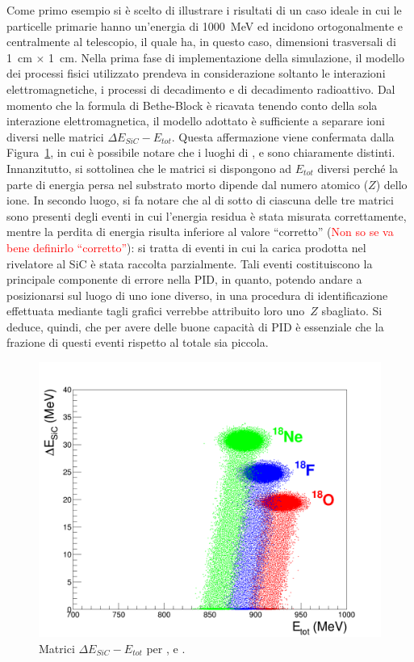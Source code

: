 Come primo esempio si è scelto di illustrare i risultati di un caso ideale in cui le particelle primarie hanno un'energia di 1000~MeV ed incidono ortogonalmente e centralmente al telescopio, il quale ha, in questo caso, dimensioni trasversali di 1~cm $\times$ 1~cm.
Nella prima fase di implementazione della simulazione, il modello dei processi fisici utilizzato prendeva in considerazione soltanto le interazioni elettromagnetiche, i processi di decadimento e di decadimento radioattivo.
Dal momento che la formula di Bethe-Block è ricavata tenendo conto della sola interazione elettromagnetica, il modello adottato è sufficiente a separare ioni diversi nelle matrici $\Delta E_{SiC} - E_{tot}$.
Questa affermazione viene confermata dalla Figura~\ref{fig:deltaE_ETot}, in cui è possibile notare che i luoghi di ,  e  sono chiaramente distinti.
Innanzitutto, si sottolinea che le matrici si dispongono ad $E_{tot}$ diversi perché la parte di energia persa nel substrato morto dipende dal numero atomico ($Z$) dello ione.
In secondo luogo, si fa notare che al di sotto di ciascuna delle tre matrici sono presenti degli eventi in cui l'energia residua è stata misurata correttamente, mentre la perdita di energia risulta inferiore al valore ``corretto'' (\textcolor{red}{Non so se va bene definirlo ``corretto''}): si tratta di eventi in cui la carica prodotta nel rivelatore al SiC è stata raccolta parzialmente. 
Tali eventi costituiscono la principale componente di errore nella PID, in quanto, potendo andare a posizionarsi sul luogo di uno ione diverso, in una procedura di identificazione effettuata mediante tagli grafici verrebbe attribuito loro uno~$Z$ sbagliato.
Si deduce, quindi, che per avere delle buone capacità di PID è essenziale che la frazione di questi eventi rispetto al totale sia piccola.


\begin{figure} [!t]
	\centering
	\includegraphics[width=\textwidth, keepaspectratio]{Grafici_Tesi/Particelle_monocromatiche/deltaE_ETot_punti_grandi.png}
	\caption{Matrici $\Delta E_{SiC} - E_{tot}$ per ,  e .} \label{fig:deltaE_ETot}
\end{figure}




